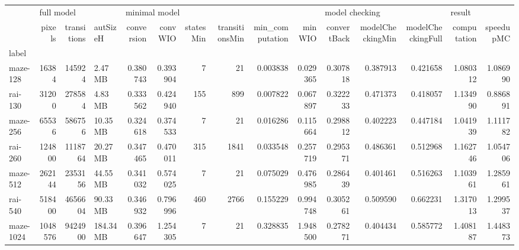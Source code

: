 \begin{tabular}{lrrlrrrrrrrrrrr}
\toprule
{} & \multicolumn{3}{l}{full model} & \multicolumn{6}{l}{minimal model} & \multicolumn{3}{l}{model checking} & \multicolumn{2}{l}{result} \\
{} &     pixels & transitions &   autSizeH &    conversion &     convWIO & statesMin & transitionsMin & min\_computation &      minWIO &    convertBack & modelCheckingMin & modelCheckingFull & computation &  speedupMC \\
label     &            &             &            &               &             &           &                &                 &             &                &                  &                   &             &            \\
\midrule
maze-128  &      16384 &      145924 &    2.47 MB &      0.380743 &    0.393904 &         7 &             21 &        0.003838 &    0.029365 &       0.307818 &         0.387913 &          0.421658 &    1.080312 &   1.086990 \\
rai-130   &      31200 &      278584 &    4.83 MB &      0.333562 &    0.424940 &       155 &            899 &        0.007822 &    0.067897 &       0.322233 &         0.471373 &          0.418057 &    1.134990 &   0.886891 \\
maze-256  &      65536 &      586756 &   10.35 MB &      0.324618 &    0.374533 &         7 &             21 &        0.016286 &    0.115664 &       0.298812 &         0.402223 &          0.447184 &    1.041939 &   1.111782 \\
rai-260   &     124800 &     1118764 &   20.27 MB &      0.347465 &    0.470011 &       315 &           1841 &        0.033548 &    0.257719 &       0.295371 &         0.486361 &          0.512968 &    1.162746 &   1.054706 \\
maze-512  &     262144 &     2353156 &   44.55 MB &      0.341032 &    0.574025 &         7 &             21 &        0.075029 &    0.476985 &       0.286439 &         0.401461 &          0.516263 &    1.103961 &   1.285961 \\
rai-540   &     518400 &     4656604 &   90.33 MB &      0.346932 &    0.796996 &       460 &           2766 &        0.155229 &    0.994748 &       0.305261 &         0.509590 &          0.662231 &    1.317013 &   1.299537 \\
maze-1024 &    1048576 &     9424900 &  184.34 MB &      0.396647 &    1.254305 &         7 &             21 &        0.328835 &    1.948500 &       0.278271 &         0.404434 &          0.585772 &    1.408187 &   1.448373 \\

\end{tabular}
